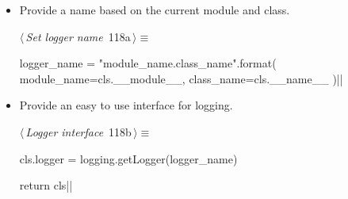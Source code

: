 \documentclass[%
    a4paper,    %
    justified,  %
    nobib,      %
    openany     %
]{tufte-book}
\makeatletter
\renewcommand{\label}[1]{\@tufte@label{##1}}%
\makeatother
\begin{document}
\begin{itemize}
  \item Provide a name based on the current module and class.
    \begin{flushleft} \small
\begin{minipage}{\linewidth}\label{scrap56}\raggedright\small
{} $\langle\,${\itshape Set logger name}\nobreak\ {\footnotesize {118a}}$\,\rangle\equiv$
\vspace{-1ex}
\begin{pythoncode}
logger_name = "{module_name}.{class_name}".format(
    module_name=cls.__module__,
    class_name=cls.__name__
)|\NWsep|
\end{pythoncode}
\vspace{1.5ex}
\footnotesize
{}
\end{minipage}\vspace{4ex}
\end{flushleft}
\item Provide an easy to use interface for logging.
    \begin{flushleft} \small
\begin{minipage}{\linewidth}\label{scrap57}\raggedright\small
{} $\langle\,${\itshape Logger interface}\nobreak\ {\footnotesize {118b}}$\,\rangle\equiv$
\vspace{-1ex}
\begin{pythoncode}
cls.logger = logging.getLogger(logger_name)

return cls|\NWsep|
\end{pythoncode}
\vspace{1.5ex}
\footnotesize
{}
\end{minipage}\vspace{4ex}
\end{flushleft}
\end{itemize}
\end{document}
